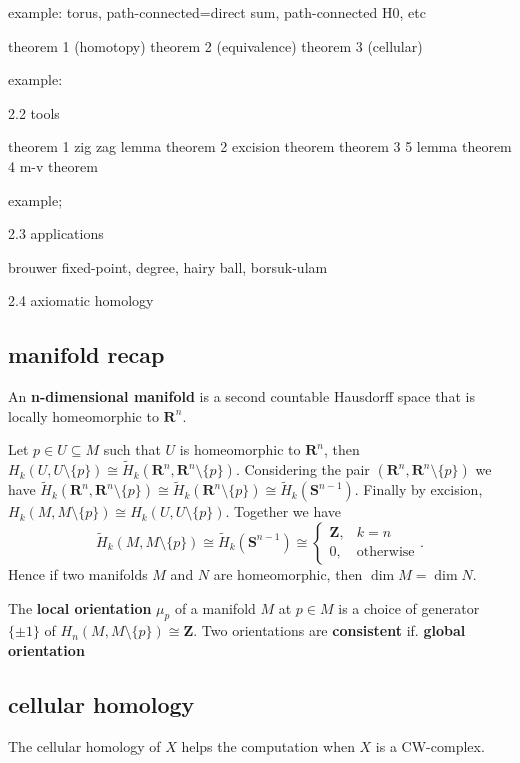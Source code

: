 \documentclass[11pt]{article}
\theoremstyle{definition}
\theoremstyle{plain}
\theoremstyle{remark}
\newcommand{\R}{\mathbf{R}}
\newcommand{\Z}{\mathbf{Z}}
\begin{document}
example: torus, path-connected=direct sum, path-connected H0, etc

theorem 1 (homotopy)
theorem 2 (equivalence)
theorem 3 (cellular)

example:

2.2 tools

theorem 1 zig zag lemma
theorem 2 excision theorem
theorem 3 5 lemma
theorem 4 m-v theorem

example;

2.3 applications

brouwer fixed-point, degree, hairy ball, borsuk-ulam


2.4 axiomatic homology

\subsection{manifold recap}

An \textbf{n-dimensional manifold} is a second countable Hausdorff space that is locally homeomorphic to $\R^n$.\medbreak

Let $p\in U\subseteq M$ such that $U$ is homeomorphic to $\R^n$, then $H_k(U,U\setminus\{p\})\cong\widetilde{H}_k(\R^n,\R^n\setminus\{p\})$. Considering the pair $(\R^n,\R^n\setminus\{p\})$ we have $\widetilde{H}_k(\R^n,\R^n\setminus\{p\})\cong \widetilde{H}_k(\R^n\setminus\{p\})\cong\widetilde{H}_k(\mathbf{S}^{n-1})$. Finally by excision, $H_k(M,M\setminus\{p\})\cong H_k(U,U\setminus\{p\})$. Together we have 
\[\widetilde{H}_k(M,M\setminus\{p\})\cong\widetilde{H}_k(\mathbf{S}^{n-1})\cong\begin{cases}
\Z,&k=n\\
0,&\textrm{otherwise}
\end{cases}.\]
Hence if two manifolds $M$ and $N$ are homeomorphic, then $\dim M=\dim N$.\medbreak

The \textbf{local orientation} $\mu_p$ of a manifold $M$ at $p\in M$ is a choice of generator $\{\pm1\}$ of $H_n(M,M\setminus\{p\})\cong\Z$. Two orientations are \textbf{consistent} if. \textbf{global orientation}

\newpage
\subsection{cellular homology}

The cellular homology of $X$ helps the computation when $X$ is a CW-complex.\medbreak
\end{document}
